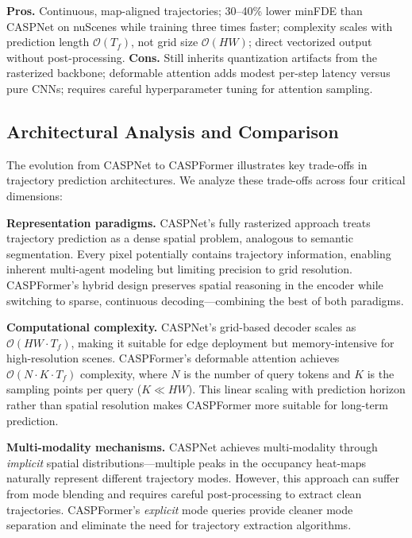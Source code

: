 \begin{description}[leftmargin=1em,itemsep=2pt]
\textbf{Pros.} Continuous, map-aligned trajectories; 30–40\% lower minFDE than CASPNet on nuScenes while training three times faster; complexity scales with prediction length \(\mathcal{O}(T_f)\), not grid size \(\mathcal{O}(HW)\); direct vectorized output without post-processing.
\textbf{Cons.} Still inherits quantization artifacts from the rasterized backbone; deformable attention adds modest per-step latency versus pure CNNs; requires careful hyperparameter tuning for attention sampling.

\subsection{Architectural Analysis and Comparison}
\label{ssec:comparison}

The evolution from CASPNet to CASPFormer illustrates key trade-offs in trajectory prediction architectures. We analyze these trade-offs across four critical dimensions:

\textbf{Representation paradigms.} CASPNet's fully rasterized approach treats trajectory prediction as a dense spatial problem, analogous to semantic segmentation. Every pixel potentially contains trajectory information, enabling inherent multi-agent modeling but limiting precision to grid resolution. CASPFormer's hybrid design preserves spatial reasoning in the encoder while switching to sparse, continuous decoding—combining the best of both paradigms.

\textbf{Computational complexity.} CASPNet's grid-based decoder scales as \(\mathcal{O}(HW \cdot T_f)\), making it suitable for edge deployment but memory-intensive for high-resolution scenes. CASPFormer's deformable attention achieves \(\mathcal{O}(N \cdot K \cdot T_f)\) complexity, where \(N\) is the number of query tokens and \(K\) is the sampling points per query (\(K \ll HW\)). This linear scaling with prediction horizon rather than spatial resolution makes CASPFormer more suitable for long-term prediction.

\textbf{Multi-modality mechanisms.} CASPNet achieves multi-modality through \emph{implicit} spatial distributions—multiple peaks in the occupancy heat-maps naturally represent different trajectory modes. However, this approach can suffer from mode blending and requires careful post-processing to extract clean trajectories. CASPFormer's \emph{explicit} mode queries provide cleaner mode separation and eliminate the need for trajectory extraction algorithms.


\end{description}
